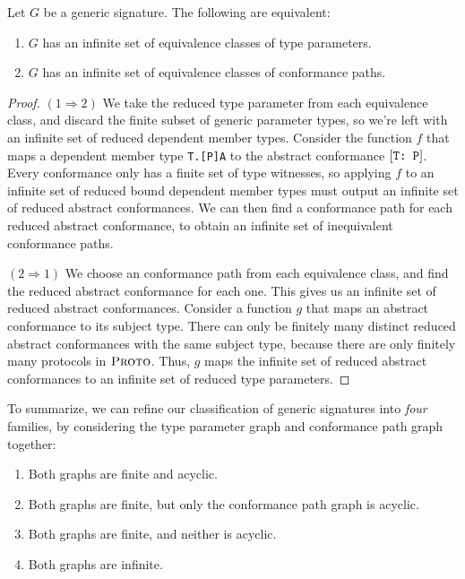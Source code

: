 \documentclass[../generics]{subfiles}
\begin{document}
\begin{proposition}\label{infinite signature lemma} Let $G$ be a generic signature. The following are equivalent:
\begin{enumerate}
\item $G$ has an infinite set of equivalence classes of type parameters.
\item $G$ has an infinite set of equivalence classes of conformance paths.
\end{enumerate}
\end{proposition}
\begin{proof}
$(1 \Rightarrow 2)$ We take the reduced type parameter from each equivalence class, and discard the finite subset of generic parameter types, so we're left with an infinite set of reduced dependent member types. Consider the function $f$ that maps a dependent member type \texttt{T.[P]A} to the abstract conformance $[\texttt{T:~P}]$. Every conformance only has a finite set of type witnesses, so applying $f$ to an infinite set of reduced bound dependent member types must output an infinite set of reduced abstract conformances. We can then find a conformance path for each reduced abstract conformance, to obtain an infinite set of inequivalent conformance paths.

$(2 \Rightarrow 1)$ We choose an conformance path from each equivalence class, and find the reduced abstract conformance for each one. This gives us an infinite set of reduced abstract conformances. Consider a function $g$ that maps an abstract conformance to its subject type. There can only be finitely many distinct reduced abstract conformances with the same subject type, because there are only finitely many protocols in $\textsc{Proto}$. Thus, $g$ maps the infinite set of reduced abstract conformances to an infinite set of reduced type parameters.
\end{proof}

To summarize, we can refine our classification of generic signatures into \emph{four} families, by considering the type parameter graph and conformance path graph together:
\begin{enumerate}
\item Both graphs are finite and acyclic.
\item Both graphs are finite, but only the conformance path graph is acyclic.
\item Both graphs are finite, and neither is acyclic.
\item Both graphs are infinite.
\end{enumerate}
\end{document}
